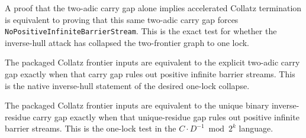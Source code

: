 \begin{theorem}
  \label{thm:collatz-two-adic-one-lock-criterion}
  \leanok
  A proof that the two-adic carry gap alone implies accelerated Collatz termination
  is equivalent to proving that this same two-adic carry gap forces
  \texttt{NoPositiveInfiniteBarrierStream}. This is the exact test for whether the
  inverse-hull attack has collapsed the two-frontier graph to one lock.
\end{theorem}
\begin{theorem}
  \label{thm:collatz-two-adic-frontier-package-collapse}
  \leanok
  The packaged Collatz frontier inputs are equivalent to the explicit two-adic carry
  gap exactly when that carry gap rules out positive infinite barrier streams. This
  is the native inverse-hull statement of the desired one-lock collapse.
\end{theorem}
\begin{theorem}
  \label{thm:collatz-two-adic-unique-frontier-package-collapse}
  \leanok
  The packaged Collatz frontier inputs are equivalent to the unique binary
  inverse-residue carry gap exactly when that unique-residue gap rules out
  positive infinite barrier streams. This is the one-lock test in the
  \(C\cdot D^{-1}\bmod 2^k\) language.
\end{theorem}
